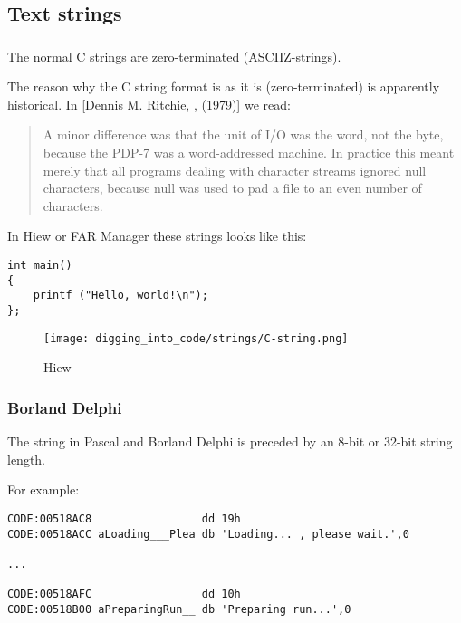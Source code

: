 \subsection{Text strings}

\subsubsection{\CCpp}

\label{C_strings}
The normal C strings are zero-terminated (\ac{ASCIIZ}-strings).

The reason why the C string format is as it is (zero-terminated) is apparently historical.
In [Dennis M. Ritchie, , (1979)]
we read:

\begin{framed}
\begin{quotation}
A minor difference was that the unit of I/O was the word, not the byte, because the PDP-7 was a word-addressed
machine. In practice this meant merely that all programs dealing with character streams ignored null
characters, because null was used to pad a file to an even number of characters.
\end{quotation}
\end{framed}


In Hiew or FAR Manager these strings looks like this:

\begin{lstlisting}[style=customc]
int main()
{
	printf ("Hello, world!\n");
};
\end{lstlisting}

\begin{figure}[H]
\centering
\texttt{[image: digging\_into\_code/strings/C-string.png]}
\caption{Hiew}
\end{figure}


\subsubsection{Borland Delphi}

The string in Pascal and Borland Delphi is preceded by an 8-bit or 32-bit string length.

For example:

\begin{lstlisting}[caption=Delphi,style=customasm]
CODE:00518AC8                 dd 19h
CODE:00518ACC aLoading___Plea db 'Loading... , please wait.',0

...

CODE:00518AFC                 dd 10h
CODE:00518B00 aPreparingRun__ db 'Preparing run...',0
\end{lstlisting}

